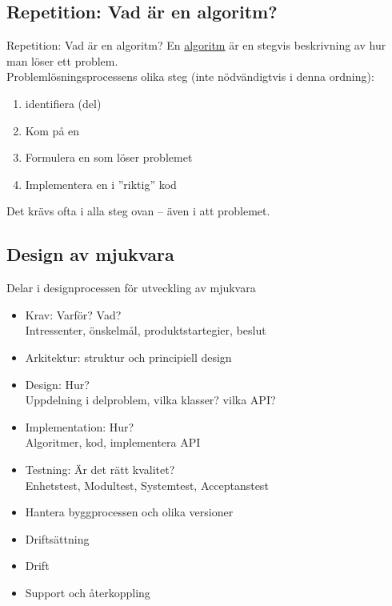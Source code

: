 \documentclass{lecturenotes}
\begin{document}
\subsection{Repetition: Vad är en algoritm?}
\begin{Slide}{Repetition: Vad är en algoritm? }\footnotesize
En \href{https://sv.wikipedia.org/wiki/Algoritm}{algoritm} är en stegvis beskrivning av hur man löser ett problem. \\ 
\vspace{1em}
Problemlösningsprocessens olika steg (inte nödvändigtvis i denna ordning): 
\begin{enumerate}
\item identifiera (del)
\item Kom på en 
\item Formulera en  som löser problemet
\item Implementera en  i ''riktig'' kod
\end{enumerate}
Det krävs ofta  i alla steg ovan  -- även i att  problemet.
\end{Slide}

\subsection{Design av mjukvara}
\begin{Slide}{Delar i designprocessen för utveckling av mjukvara}
\begin{itemize}
\item Krav: Varför? Vad? \\ Intressenter, önskelmål, produktstartegier, beslut
\item Arkitektur: struktur och principiell design
\item Design: Hur? \\ Uppdelning i delproblem, vilka klasser? vilka API?
\item Implementation: Hur? \\ 
Algoritmer, kod, implementera API
\item Testning: Är det rätt kvalitet? \\ Enhetstest, Modultest, Systemtest, Acceptanstest
\item Hantera byggprocessen och olika versioner
\item Driftsättning  
\item Drift 
\item Support och återkoppling
\end{itemize}
\end{Slide}
\end{document}
